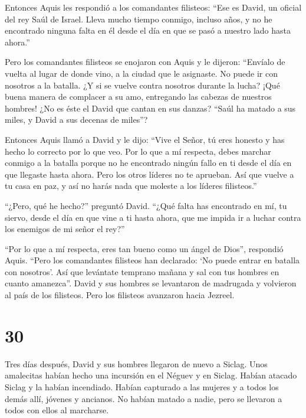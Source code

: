 Entonces Aquis les respondió a los comandantes filisteos: ``Ese es
David, un oficial del rey Saúl de Israel. Lleva mucho tiempo conmigo,
incluso años, y no he encontrado ninguna falta en él desde el día en que
se pasó a nuestro lado hasta ahora.''

 Pero los comandantes filisteos se enojaron con Aquis y le
dijeron: ``Envíalo de vuelta al lugar de donde vino, a la ciudad que le
asignaste. No puede ir con nosotros a la batalla. ¿Y si se vuelve contra
nosotros durante la lucha? ¡Qué buena manera de complacer a su amo,
entregando las cabezas de nuestros hombres!  ¿No es éste el
David que cantan en sus danzas? ``Saúl ha matado a sus miles, y David a
sus decenas de miles''?

 Entonces Aquis llamó a David y le dijo: ``Vive el Señor, tú
eres honesto y has hecho lo correcto por lo que veo. Por lo que a mí
respecta, debes marchar conmigo a la batalla porque no he encontrado
ningún fallo en ti desde el día en que llegaste hasta ahora. Pero los
otros líderes no te aprueban.  Así que vuelve a tu casa en
paz, y así no harás nada que moleste a los líderes filisteos.''

 ``¿Pero, qué he hecho?'' preguntó David. ``¿Qué falta has
encontrado en mí, tu siervo, desde el día en que vine a ti hasta ahora,
que me impida ir a luchar contra los enemigos de mi señor el rey?''

 ``Por lo que a mí respecta, eres tan bueno como un ángel de
Dios'', respondió Aquis. ``Pero los comandantes filisteos han declarado:
`No puede entrar en batalla con nosotros'.  Así que
levántate temprano mañana y sal con tus hombres en cuanto amanezca''.
 David y sus hombres se levantaron de madrugada y volvieron
al país de los filisteos. Pero los filisteos avanzaron hacia Jezreel.

\hypertarget{section-29}{%
\section{30}\label{section-29}}

 Tres días después, David y sus hombres llegaron de nuevo a
Siclag. Unos amalecitas habían hecho una incursión en el Néguev y en
Siclag. Habían atacado Siclag y la habían incendiado. 
Habían capturado a las mujeres y a todos los demás allí, jóvenes y
ancianos. No habían matado a nadie, pero se llevaron a todos con ellos
al marcharse.

